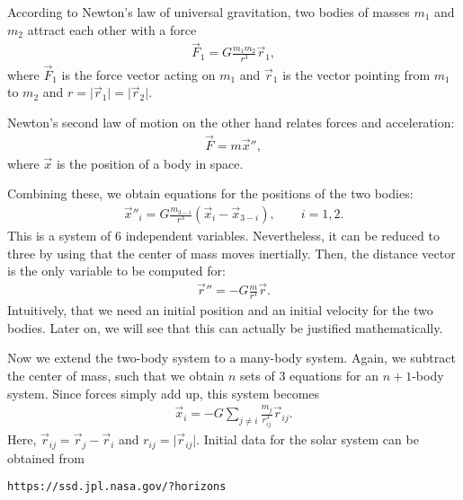 \begin{example}
  According to Newton's law of universal gravitation, two bodies of
  masses $m_1$ and $m_2$ attract each other with a force
  \begin{gather*}
    \vec F_1 = G \frac{m_1m_2}{r^3} \vec r_1,
  \end{gather*}
  where $\vec F_1$ is the force vector acting on $m_1$ and $\vec r_1$
  is the vector pointing from $m_1$ to $m_2$ and $r = \lvert\vec r_1\rvert = \lvert\vec r_2\rvert$.

  Newton's second law of motion on the other hand relates forces and
  acceleration:
  \begin{gather*}
    \vec F = m \vec x'',
  \end{gather*}
  where $\vec x$ is the position of a body in space.

  Combining these, we obtain equations for the positions of the two bodies:
  \begin{gather*}
    \vec x''_i = G \frac{m_{3-i}}{r^3} (\vec x_i - \vec x_{3-i}), \qquad i=1,2.
  \end{gather*}
  This is a system of 6 independent variables. Nevertheless, it can be
  reduced to three by using that the center of mass moves
  inertially. Then, the distance vector is the only variable to be
  computed for:
  \begin{gather*}
    \vec r'' = - G \frac{m}{r^3} \vec r.
  \end{gather*}
  Intuitively, that we need an initial position and an initial
  velocity for the two bodies. Later on, we will see that this can
  actually be justified mathematically.
\end{example}

\begin{example}
  Now we extend the two-body system to a many-body system. Again, we
  subtract the center of mass, such that we obtain $n$ sets of 3
  equations for an $n+1$-body system. Since forces simply add up, this
  system becomes
  \begin{gather}
    \label{eq:celestial}
    \vec x_i = -G \sum_{j\neq i} \frac{m_j}{r_{ij}^3} \vec r_{ij}.
  \end{gather}
  Here, $\vec r_{ij} = \vec r_j - \vec r_i$ and $r_{ij} = \lvert \vec r_{ij}\rvert$.
  Initial data for the solar system can be obtained from
  \begin{center}
    \texttt{https://ssd.jpl.nasa.gov/?horizons}
  \end{center}
\end{example}


